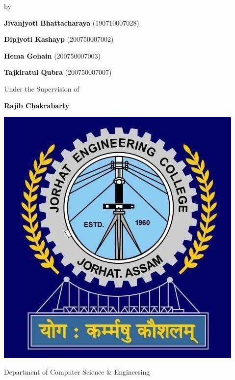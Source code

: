 \begin{titlepage}
\begin{center}
\vspace{5mm}
    {\large by\par}
    \vspace{0.05cm}
    {\large \textbf{\textcolor{black}{Jivanjyoti Bhattacharaya}}  (190710007028)\par} 
    {\large \textbf{\textcolor{black}{Dipjyoti Kashayp}}  (200750007002)\par} 
    {\large \textbf{\textcolor{black}{Hema Gohain}}  (200750007003)\par} 
    {\large \textbf{\textcolor{black}{Tajkiratul Qubra}}  (200750007007)\par} 
    \vspace{0.4cm}
    
    { Under the Supervision of \par}
    {\large \textbf{\textbf{\textcolor{black}{Rajib Chakrabarty}}}\par}
     \vspace{0.8 cm}

\includegraphics[width=0.25\linewidth]{Images/jec_logo.png}
     \vspace{0.6 cm}

    
    {\large Department of Computer Science \& Engineering\par}
    \vspace{0.4cm}


\end{center}
\end{titlepage}
